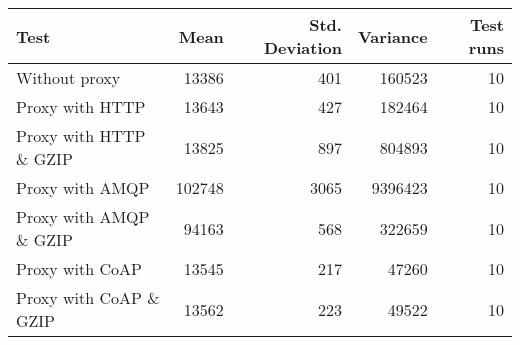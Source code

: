 \begin{tabular}{lrrrr}
\hline
 Test                   &   Mean &   Std. Deviation &   Variance &   Test runs \\
\hline
 Without proxy          &  13386 &              401 &     160523 &          10 \\
 Proxy with HTTP        &  13643 &              427 &     182464 &          10 \\
 Proxy with HTTP \& GZIP &  13825 &              897 &     804893 &          10 \\
 Proxy with AMQP        & 102748 &             3065 &    9396423 &          10 \\
 Proxy with AMQP \& GZIP &  94163 &              568 &     322659 &          10 \\
 Proxy with CoAP        &  13545 &              217 &      47260 &          10 \\
 Proxy with CoAP \& GZIP &  13562 &              223 &      49522 &          10 \\
\hline
\end{tabular}